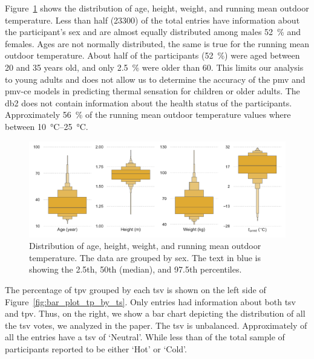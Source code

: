 Figure~\ref{fig:dist_other_data} shows the distribution of age, height, weight, and running mean outdoor temperature.
Less than half (\num{23300}) of the total entries have information about the participant's sex and are almost equally distributed among males \qty{52}{\percent} and females.
Ages are not normally distributed, the same is true for the running mean outdoor temperature.
About half of the participants (\qty{52}{\percent}) were aged between \num{20} and \num{35} years old, and only \qty{2.5}{\percent} were older than 60.
This limits our analysis to young adults and does not allow us to determine the accuracy of the \ac{pmv} and \ac{pmv-ce} models in predicting thermal sensation for children or older adults.
The \ac{db2} does not contain information about the health status of the participants.
Approximately \qty{56}{\percent} of the running mean outdoor temperature values where between \qtyrange{10}{25}{\celsius}.
\begin{figure}[htb!]
    \centering
    \includegraphics[width=\textwidth]{figures/dist_other_data}
    \caption{Distribution of age, height, weight, and running mean outdoor temperature.
    The data are grouped by sex.
    The text in blue is showing the 2.5th, 50th (median), and 97.5th percentiles.}
    \label{fig:dist_other_data}
\end{figure}
The percentage of \ac{tpv} grouped by each \ac{tsv} is shown on the left side of Figure~\ref{fig:bar_plot_tp_by_ts}.
Only  entries had information about both \ac{tsv} and \ac{tpv}.
Thus, on the right, we show a bar chart depicting the distribution of all the \ac{tsv} votes, we analyzed in the paper.
The \ac{tsv} is unbalanced. 
Approximately  of all the entries have a \ac{tsv} of `Neutral'.
While less than  of the total sample of participants reported to be either `Hot' or `Cold'.
